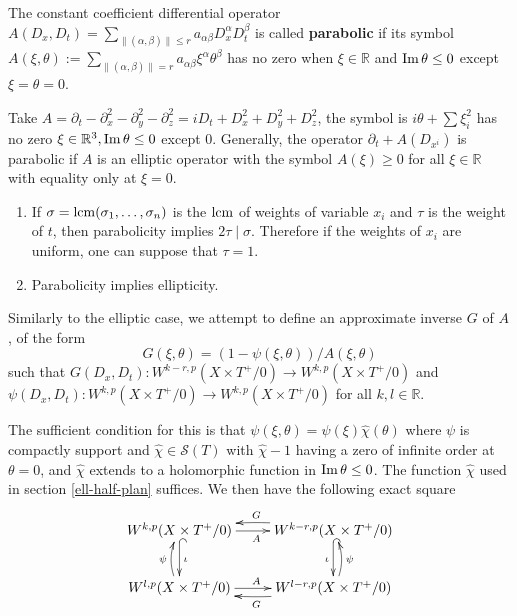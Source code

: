 \begin{definition}
The constant coefficient differential operator \(A(D_x,D_t) =
\sum_{\|(\alpha,\beta)\|\leq r}a_{\alpha\beta}D^\alpha_x D^\beta_t\) is called
\textbf{parabolic} if its symbol \(A(\xi,\theta):= \sum_{\|(\alpha,\beta)\| = r}
a_{\alpha\beta}\xi^\alpha\theta^\beta\) has no zero when \(\xi\in \mathbb{R}\) and \(\mathop{\rm Im}\nolimits \theta \leq 0\) except \(\xi=\theta=0\).
\end{definition}

\begin{exampl}
Take \(A= \partial_t - \partial_x^2 - \partial_y^2 - \partial_z^2 = iD_t + D_x^2 +
D_y^2 + D_z^2\), the symbol is \(i\theta + \sum \xi_i^2\) has no zero \(\xi\in
\mathbb{R}^3,\mathop{\rm Im}\nolimits\theta \leq 0\) except \(0\). Generally, the operator \(\partial_t + A(D_{x^i})\) is parabolic if \(A\) is an elliptic operator with the symbol
\(A(\xi)\geq 0\) for all \(\xi\in \mathbb{R}\) with equality only at \(\xi=0\).
\end{exampl}

\begin{remark}
\begin{enumerate}
\item If \(\sigma = \mathop{\rm lcm}\nolimits (\sigma_1,\dots,\sigma_n)\) is the \(\mathop{\rm lcm}\nolimits\) of weights of variable
\(x_i\) and \(\tau\) is the weight of \(t\), then parabolicity implies \(2\tau \mid
   \sigma\). Therefore if the weights of \(x_i\) are uniform, one can suppose that \(\tau
   = 1\).
\item Parabolicity implies ellipticity.
\end{enumerate}
\end{remark}

Similarly to the elliptic case, we attempt to define an approximate inverse \(G\) of \(A\), of the form
\[
 G(\xi,\theta) = (1-\psi(\xi,\theta))/A(\xi,\theta)
\]
such that \(G(D_x,D_t): W^{k-r,p}(X\times T^+/0) \longrightarrow  W^{k,p}(X\times T^+/0)\) and \(\psi(D_x,D_t): W^{k,p}(X\times T^+/0) \longrightarrow W^{k,p}(X\times T^+/0)\)
for all \(k,l\in \mathbb{R}\).

The sufficient condition for this is that \(\psi(\xi,\theta) = \psi(\xi)\hat\chi(\theta)\) where \(\psi\) is compactly support and \(\hat\chi\in \mathcal{S}(T)\) with \(\hat\chi - 1\) having a zero of infinite order at \(\theta = 0\), and \(\hat\chi\)
extends to a holomorphic function in \(\mathop{\rm Im}\nolimits \theta \leq 0\). The function \(\hat\chi\)
used in section \ref{ell-half-plan} suffices. We then have the following exact square
\[
\xymatrix{
W^{k,p}(X\times T^+/0) \ar@{->}[r]_{A} \ar@{^{(}->}[d]^{\iota} & W^{k-r,p}(X\times T^+/0) \ar@{^{(}->}[d]_{\iota} \ar@/_/@{->}[l]_{G} \\
W^{l,p}(X\times T^+/0) \ar@{->}[r]^{A} \ar@/^/@{->}[u]^{\psi} & W^{l-r,p}(X\times T^+/0) \ar@/^/@{->}[l]^{G} \ar@/_/@{->}[u]_{\psi}
}
\]

